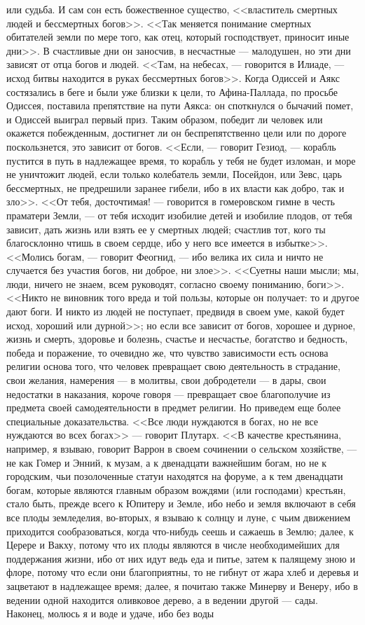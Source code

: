 \documentclass[12pt]{article}
\begin{document}
или судьба. И сам сон есть божественное существо, <<властитель смертных людей и бессмертных богов>>. <<Так меняется понимание смертных обитателей земли по мере того, как отец, который господствует, приносит иные дни>>. В счастливые дни он заносчив, в несчастные --- малодушен, но эти дни зависят от отца богов и людей. <<Там, на небесах, --- говорится в Илиаде, --- исход битвы находится в руках бессмертных богов>>. Когда Одиссей и Аякс состязались в беге и были уже близки к цели, то Афина-Паллада, по просьбе Одиссея, поставила препятствие на пути Аякса: он споткнулся о бычачий помет, и Одиссей выиграл первый приз. Таким образом, победит ли человек или окажется побежденным, достигнет ли он беспрепятственно цели или по дороге поскользнется, это зависит от богов. <<Если, --- говорит Гезиод, --- корабль пустится в путь в надлежащее время, то корабль у тебя не будет изломан, и море не уничтожит людей, если только колебатель земли, Посейдон, или Зевс, царь бессмертных, не предрешили заранее гибели, ибо в их власти как добро, так и зло>>. <<От тебя, досточтимая! --- говорится в гомеровском гимне в честь праматери Земли, --- от тебя исходит изобилие детей и изобилие плодов, от тебя зависит, дать жизнь или взять ее у смертных людей; счастлив тот, кого ты благосклонно чтишь в своем сердце, ибо у него все имеется в избытке>>. <<Молись богам, --- говорит Феогнид, --- ибо велика их сила и ничто не случается без участия богов, ни доброе, ни злое>>. <<Суетны наши мысли; мы, люди, ничего не знаем, всем руководят, согласно своему пониманию, боги>>. <<Никто не виновник того вреда и той пользы, которые он получает: то и другое дают боги. И никто из людей не поступает, предвидя в своем уме, какой будет исход, хороший или дурной>>; но если все зависит от богов, хорошее и дурное, жизнь и смерть, здоровье и болезнь, счастье и несчастье, богатство и бедность, победа и поражение, то очевидно же, что чувство зависимости есть основа религии основа того, что человек превращает свою деятельность в страдание, свои желания, намерения --- в молитвы, свои добродетели --- в дары, свои недостатки в наказания, короче говоря --- превращает свое благополучие из предмета своей самодеятельности в предмет религии. Но приведем еще более специальные доказательства. <<Все люди нуждаются в богах, но не все нуждаются во всех богах>>  --- говорит Плутарх. <<В качестве крестьянина, например, я взываю, говорит Варрон в своем сочинении о сельском хозяйстве, --- не как Гомер и Энний, к музам, а к двенадцати важнейшим богам, но не к городским, чьи позолоченные статуи находятся на форуме, а к тем двенадцати богам, которые являются главным образом вождями (или господами) крестьян, стало быть, прежде всего к Юпитеру и Земле, ибо небо и земля включают в себя все плоды земледелия, во-вторых, я взываю к солнцу и луне, с чьим движением приходится сообразоваться, когда что-нибудь сеешь и сажаешь в Землю; далее, к Церере и Вакху, потому что их плоды являются в числе необходимейших для поддержания жизни, ибо от них идут ведь еда и питье, затем к палящему зною и флоре, потому что если они благоприятны, то не гибнут от жара хлеб и деревья и зацветают в надлежащее время; далее, я почитаю также Минерву и Венеру, ибо в ведении одной находится оливковое дерево, а в ведении другой --- сады. Наконец, молюсь я и воде и удаче, ибо без воды 
\end{document}
